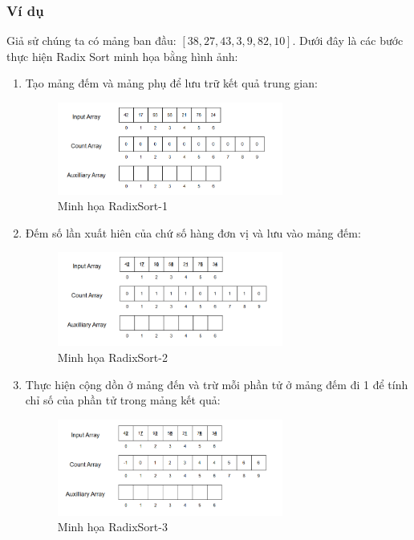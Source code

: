 \subsubsection{Ví dụ}

Giả sử chúng ta có mảng ban đầu: $[38, 27, 43, 3, 9, 82, 10]$. Dưới đây là các bước thực hiện Radix Sort minh họa bằng hình ảnh:

\begin{enumerate}
    \item Tạo mảng đếm và mảng phụ để lưu trữ kết quả trung gian:
    \begin{figure}[H]
        \centering
        \includegraphics[width=0.7\textwidth]{img/radix_sort/1.png}
        \caption{Minh họa RadixSort-1}
    \end{figure}
    
    \item Đếm số lần xuất hiên của chứ số hàng đơn vị và lưu vào mảng đếm:
    \begin{figure}[H]
        \centering
        \includegraphics[width=0.7\textwidth]{img/radix_sort/2.png}
        \caption{Minh họa RadixSort-2}
    \end{figure}
    
    \item Thực hiện cộng dồn ở mảng đến và trừ mỗi phần tử ở mảng đếm đi 1 để tính chỉ số của phần tử trong mảng kết quả:
    \begin{figure}[H]
        \centering
        \includegraphics[width=0.7\textwidth]{img/radix_sort/3.png}
        \caption{Minh họa RadixSort-3}
    \end{figure}
    

\end{enumerate}
